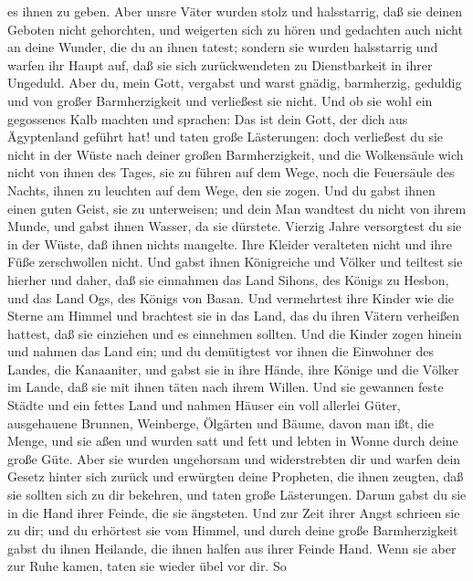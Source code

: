 es ihnen zu geben.  Aber unsre Väter wurden stolz und
halsstarrig, daß sie deinen Geboten nicht gehorchten,  und
weigerten sich zu hören und gedachten auch nicht an deine Wunder, die du
an ihnen tatest; sondern sie wurden halsstarrig und warfen ihr Haupt
auf, daß sie sich zurückwendeten zu Dienstbarkeit in ihrer Ungeduld.
Aber du, mein Gott, vergabst und warst gnädig, barmherzig, geduldig und
von großer Barmherzigkeit und verließest sie nicht.  Und ob
sie wohl ein gegossenes Kalb machten und sprachen: Das ist dein Gott,
der dich aus Ägyptenland geführt hat! und taten große Lästerungen:
 doch verließest du sie nicht in der Wüste nach deiner
großen Barmherzigkeit, und die Wolkensäule wich nicht von ihnen des
Tages, sie zu führen auf dem Wege, noch die Feuersäule des Nachts, ihnen
zu leuchten auf dem Wege, den sie zogen.  Und du gabst
ihnen einen guten Geist, sie zu unterweisen; und dein Man wandtest du
nicht von ihrem Munde, und gabst ihnen Wasser, da sie dürstete.
 Vierzig Jahre versorgtest du sie in der Wüste, daß ihnen
nichts mangelte. Ihre Kleider veralteten nicht und ihre Füße
zerschwollen nicht.  Und gabst ihnen Königreiche und Völker
und teiltest sie hierher und daher, daß sie einnahmen das Land Sihons,
des Königs zu Hesbon, und das Land Ogs, des Königs von Basan.
 Und vermehrtest ihre Kinder wie die Sterne am Himmel und
brachtest sie in das Land, das du ihren Vätern verheißen hattest, daß
sie einziehen und es einnehmen sollten.  Und die Kinder
zogen hinein und nahmen das Land ein; und du demütigtest vor ihnen die
Einwohner des Landes, die Kanaaniter, und gabst sie in ihre Hände, ihre
Könige und die Völker im Lande, daß sie mit ihnen täten nach ihrem
Willen.  Und sie gewannen feste Städte und ein fettes Land
und nahmen Häuser ein voll allerlei Güter, ausgehauene Brunnen,
Weinberge, Ölgärten und Bäume, davon man ißt, die Menge, und sie aßen
und wurden satt und fett und lebten in Wonne durch deine große Güte.
 Aber sie wurden ungehorsam und widerstrebten dir und
warfen dein Gesetz hinter sich zurück und erwürgten deine Propheten, die
ihnen zeugten, daß sie sollten sich zu dir bekehren, und taten große
Lästerungen.  Darum gabst du sie in die Hand ihrer Feinde,
die sie ängsteten. Und zur Zeit ihrer Angst schrieen sie zu dir; und du
erhörtest sie vom Himmel, und durch deine große Barmherzigkeit gabst du
ihnen Heilande, die ihnen halfen aus ihrer Feinde Hand. 
Wenn sie aber zur Ruhe kamen, taten sie wieder übel vor dir. So
